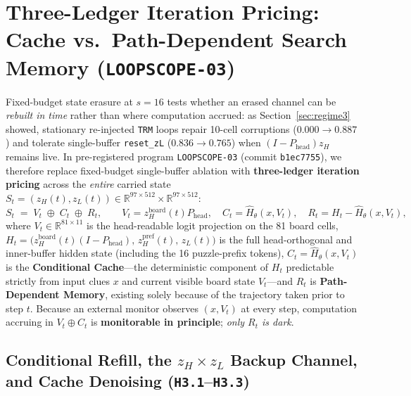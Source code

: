 \documentclass[10pt,letterpaper]{article}
\newcommand{\Phead}{P_{\mathrm{head}}}
\begin{document}
\section{Three-Ledger Iteration Pricing: Cache vs.\ Path-Dependent Search Memory (\texttt{LOOPSCOPE-03})}\label{sec:loopscope03}

Fixed-budget state erasure at $s=16$ tests whether an erased channel can be \emph{rebuilt in time} rather than where computation accrued: as Section~\ref{sec:regime3} showed, stationary re-injected \texttt{TRM} loops repair 10-cell corruptions ($0.000 \to 0.887$) and tolerate single-buffer \texttt{reset\_zL} ($0.836 \to 0.765$) when $(I-\Phead)z_H$ remains live. In pre-registered program \texttt{LOOPSCOPE-03} (commit \texttt{b1ec7755}), we therefore replace fixed-budget single-buffer ablation with \textbf{three-ledger iteration pricing} across the \emph{entire} carried state $S_t = (z_H(t), z_L(t)) \in \mathbb{R}^{97\times 512} \times \mathbb{R}^{97\times 512}$:
\begin{equation}
  S_t \;=\; V_t \;\oplus\; C_t \;\oplus\; R_t,
  \qquad
  V_t = z_H^{\mathrm{board}}(t)\Phead,\quad
  C_t = \hat{H}_\theta(x, V_t),\quad
  R_t = H_t - \hat{H}_\theta(x, V_t),
  \label{eq:three_ledgers}
\end{equation}
where $V_t \in \mathbb{R}^{81\times 11}$ is the head-readable logit projection on the 81 board cells, $H_t = \bigl(z_H^{\mathrm{board}}(t)(I-\Phead),\allowbreak\, z_H^{\mathrm{pref}}(t),\allowbreak\, z_L(t)\bigr)$ is the full head-orthogonal and inner-buffer hidden state (including the 16 puzzle-prefix tokens), $C_t = \hat{H}_\theta(x, V_t)$ is the \textbf{Conditional Cache}—the deterministic component of $H_t$ predictable strictly from input clues $x$ and current visible board state $V_t$—and $R_t$ is \textbf{Path-Dependent Memory}, existing solely because of the trajectory taken prior to step $t$. Because an external monitor observes $(x, V_t)$ at every step, computation accruing in $V_t \oplus C_t$ is \textbf{monitorable in principle}; \emph{only $R_t$ is dark}.

\subsection{Conditional Refill, the \texorpdfstring{$z_H \times z_L$}{z\_H x z\_L} Backup Channel, and Cache Denoising (\texttt{H3.1}--\texttt{H3.3})}
\end{document}
